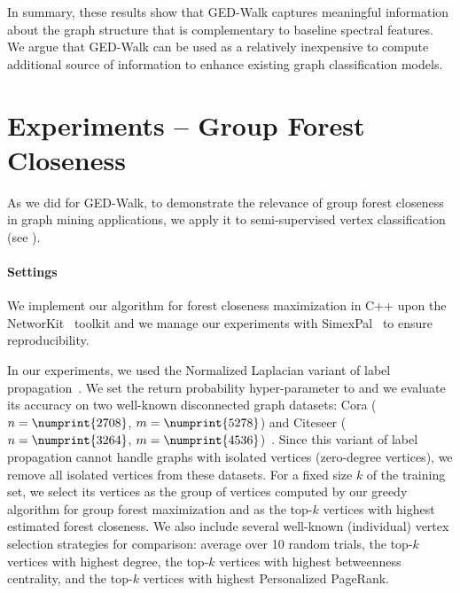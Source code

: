 In summary, these results show that GED-Walk captures meaningful information about
the graph structure that is complementary to baseline spectral features. We argue that
GED-Walk can be used as a relatively inexpensive to compute additional source of
information to enhance existing graph classification models.

\begin{table}[tb]
\centering
\setlength{\tabcolsep}{4pt}
\footnotesize
{}
\label{tab:ged-walk:graph-class-acc}

\end{table}

\section{Experiments -- Group Forest Closeness}
%
As we did for GED-Walk, to demonstrate the relevance of group forest closeness
in graph mining applications, we apply it to semi-supervised vertex
classification~\cite{DBLP:journals/tnn/ChapelleSZ09} (see
).

\paragraph{Settings}
We implement our algorithm for forest closeness maximization
in C++ upon the NetworKit~\cite{DBLP:journals/netsci/StaudtSM16} toolkit and we
manage our experiments with
SimexPal~\cite{DBLP:journals/algorithms/AngrimanGLMNPT19} to ensure
reproducibility.

In our experiments, we used the Normalized Laplacian variant of label
propagation~\cite{DBLP:conf/nips/ZhouBLWS03}. We set the return probability
hyper-parameter to  and we evaluate its accuracy on two
well-known disconnected graph datasets: Cora ($n = \numprint{2708}$,
$m = \numprint{5278}$) and Citeseer ($n = \numprint{3264}$,
$m = \numprint{4536}$)~\cite{sen2008collective}.
Since this variant of label propagation cannot handle graphs with isolated
vertices (\ie zero-degree vertices), we remove all isolated vertices from
these datasets. For a fixed size $k$ of the training set, we select its
vertices as the group of vertices computed by our greedy algorithm for
group forest maximization and as the top-$k$ vertices with highest
estimated forest closeness. We also include several well-known
(individual) vertex selection strategies for comparison: average
over 10 random trials, the top-$k$ vertices with highest degree,
the top-$k$ vertices with highest betweenness centrality, and the
top-$k$ vertices with highest Personalized PageRank.

